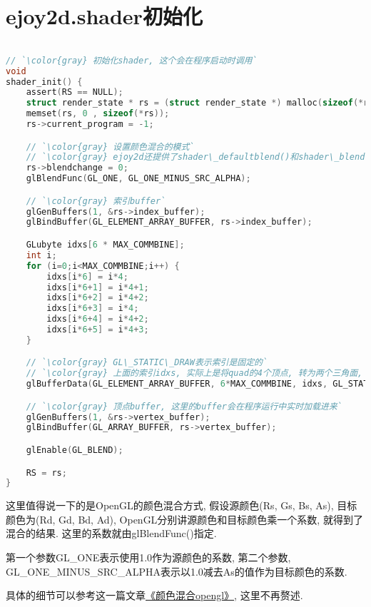 \section {\ZHH ejoy2d.shader初始化} {

\begin{lstlisting}[language=C]

// `\color{gray} 初始化shader, 这个会在程序启动时调用`
void
shader_init() {
    assert(RS == NULL);
    struct render_state * rs = (struct render_state *) malloc(sizeof(*rs));
    memset(rs, 0 , sizeof(*rs));
    rs->current_program = -1;

    // `\color{gray} 设置颜色混合的模式`
    // `\color{gray} ejoy2d还提供了shader\_defaultblend()和shader\_blend()接口来操作blend方式`
    rs->blendchange = 0;
    glBlendFunc(GL_ONE, GL_ONE_MINUS_SRC_ALPHA);

    // `\color{gray} 索引buffer`
    glGenBuffers(1, &rs->index_buffer);
    glBindBuffer(GL_ELEMENT_ARRAY_BUFFER, rs->index_buffer);

    GLubyte idxs[6 * MAX_COMMBINE];
    int i;
    for (i=0;i<MAX_COMMBINE;i++) {
        idxs[i*6] = i*4;
        idxs[i*6+1] = i*4+1;
        idxs[i*6+2] = i*4+2;
        idxs[i*6+3] = i*4;
        idxs[i*6+4] = i*4+2;
        idxs[i*6+5] = i*4+3;
    }

    // `\color{gray} GL\_STATIC\_DRAW表示索引是固定的`
    // `\color{gray} 上面的索引idxs, 实际上是将quad的4个顶点, 转为两个三角面, 节约了2个冗余顶点`
    glBufferData(GL_ELEMENT_ARRAY_BUFFER, 6*MAX_COMMBINE, idxs, GL_STATIC_DRAW);

    // `\color{gray} 顶点buffer, 这里的buffer会在程序运行中实时加载进来`
    glGenBuffers(1, &rs->vertex_buffer);
    glBindBuffer(GL_ARRAY_BUFFER, rs->vertex_buffer);

    glEnable(GL_BLEND);

    RS = rs;
}

\end{lstlisting} \par

    {这里值得说一下的是OpenGL的颜色混合方式, 假设源颜色(Rs, Gs, Bs, As), 目标颜色为(Rd, Gd, Bd, Ad), OpenGL分别讲源颜色和目标颜色乘一个系数, 就得到了混合的结果. 这里的系数就由glBlendFunc()指定. }\par

    {第一个参数GL\_ONE表示使用1.0作为源颜色的系数, 第二个参数, GL\_ONE\_MINUS\_SRC\_ALPHA表示以1.0减去As的值作为目标颜色的系数. } \par

    {具体的细节可以参考这一篇文章\href{http://blog.csdn.net/aurora_mylove/article/details/1700540}{《颜色混合opengl》}, 这里不再赘述. }\par

}

